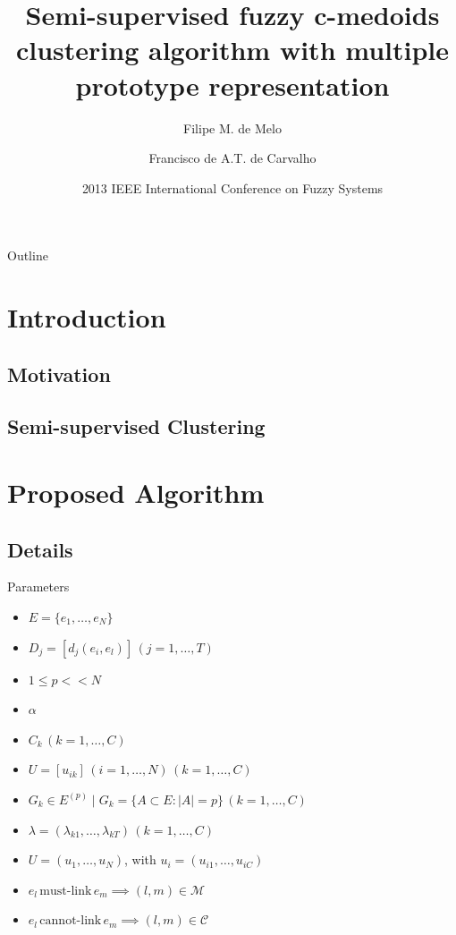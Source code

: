 \documentclass{beamer}
\title[Semi-supervised fuzzy c-medoids clustering algorithm]{Semi-supervised fuzzy c-medoids clustering algorithm with multiple prototype representation}
\author{
	Filipe M. de Melo\inst{1} \and Francisco de A.T. de Carvalho\inst{1}
}
\institute{
	Center of Informatics\\
	Federal University of Pernambuco
}
\date[fuzzIEEE 2013]{2013 IEEE International Conference on Fuzzy Systems}
\begin{document}
\begin{frame}
	\titlepage
\end{frame}

\begin{frame}{Outline}
	\tableofcontents
\end{frame}

\section{Introduction}
\subsection{Motivation}
\subsection{Semi-supervised Clustering}

\section{Proposed Algorithm}

%
\subsection{Details}

\begin{frame}{Parameters}
\begin{itemize}
\item{$E=\{e_{1},\ldots,e_{N}\}$}
\item{$D_{j}=[d_{j}(e_{i},e_{l})]\,(j=1,\ldots,T)$}
\item{$1 \leq p << N$}
\item{$\alpha$}
\item{$C_{k}\,(k=1,\ldots,C)$}
\item{$U=[u_{ik}]\,(i=1,\ldots,N)\,(k=1,\ldots,C)$}
\item{$G_{k} \in E^{(p)} \mid G_{k}=\{A \subset E:\left|{A}\right|=p\}\,(k=1,\ldots,C)$}
\item{$\lambda=(\lambda_{k1},\ldots,\lambda_{kT})\,(k=1,\ldots,C)$}
\item{${U}=({u}_1,\ldots,{u}_N)$, with ${u}_i=(u_{i1},\ldots,u_{iC})$}
\item{$e_{l}\,\text{must-link}\,e_{m} \implies (l,m) \in \mathcal{M}$}
\item{$e_{l}\,\text{cannot-link}\,e_{m} \implies (l,m) \in \mathcal{C}$}
\end{itemize}
\end{frame}
\end{document}
